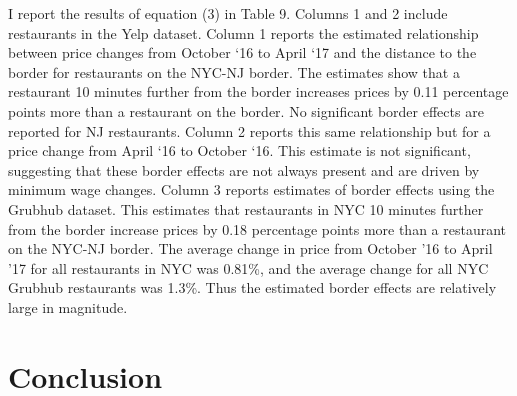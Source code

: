 \documentclass[11pt]{article}
\begin{document}
I report the results of equation (3) in Table 9. Columns 1 and 2 include restaurants in the Yelp dataset. Column 1 reports the estimated relationship between price changes from October `16 to April `17 and the distance to the border for restaurants on the NYC-NJ border. The estimates show that a restaurant 10 minutes further from the border increases prices by 0.11 percentage points more than a restaurant on the border. No significant border effects are reported for NJ restaurants. Column 2 reports this same relationship but for a price change from April `16 to October `16. This estimate is not significant, suggesting that these border effects are not always present and are driven by minimum wage changes. Column 3 reports estimates of border effects using the Grubhub dataset. This estimates that restaurants in NYC 10 minutes further from the border increase prices by 0.18 percentage points more than a restaurant on the NYC-NJ border. The average change in price from October '16 to April '17 for all restaurants in NYC was 0.81\%, and the average change for all NYC Grubhub restaurants was 1.3\%. Thus the estimated border effects are relatively large in magnitude.




\section{Conclusion}
\end{document}
